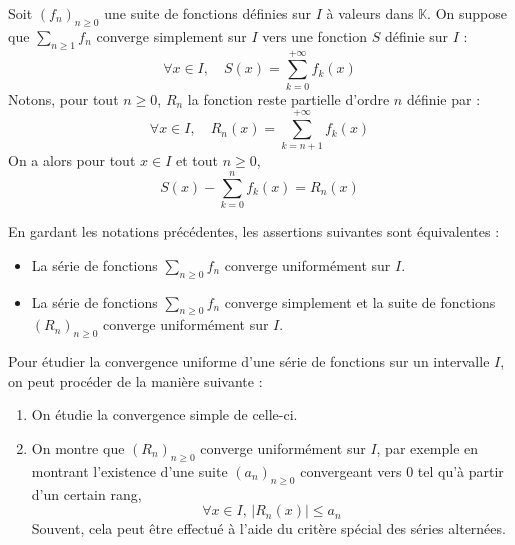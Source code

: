 \documentclass[a4paper,10pt]{report}
\begin{document}
\medskip

Soit $(f_n)_{n \geq 0}$ une suite de fonctions définies sur $I$ à valeurs dans $\mathbb{K}$. On suppose que $\sum_{n \geq 1} f_n$ converge simplement sur $I$ vers une fonction $S$ définie sur $I$ :
$$ \forall x \in I, \quad S(x) = \sum_{k=0}^{+ \infty} f_k(x)$$
Notons, pour tout $n \geq 0$, $R_n$ la fonction reste partielle d'ordre $n$ définie par :
$$ \forall x \in I, \quad R_n(x) = \sum_{k=n+1}^{+ \infty} f_k(x)$$
On a alors pour tout $x \in I$ et tout $n \geq 0$,
$$ S(x) - \sum_{k=0}^n f_k(x) = R_n(x)$$

\begin{Proposition}{}\label{CritCVU} En gardant les notations précédentes, les assertions suivantes sont équivalentes :

\begin{itemize}
\item La série de fonctions $\sum_{n \geq 0} f_n$ converge uniformément sur $I$.
\item La série de fonctions $\sum_{n \geq 0} f_n$ converge simplement et la suite de fonctions $(R_n)_{n \geq 0}$ converge uniformément sur $I$.
\end{itemize}
\end{Proposition}

\begin{metho} Pour étudier la convergence uniforme d'une série de fonctions sur un intervalle $I$, on peut procéder de la manière suivante :
\begin{enumerate}
\item On étudie la convergence simple de celle-ci.
\item On montre que $(R_n)_{n \geq 0}$ converge uniformément sur $I$, par exemple en montrant l'existence d'une suite $(a_n)_{n \geq 0}$ convergeant vers $0$ tel qu'à partir d'un certain rang,
$$ \forall x \in I, \, \vert R_n(x) \vert \leq a_n $$
Souvent, cela peut être effectué à l'aide du critère spécial des séries alternées.
\end{enumerate}
\end{metho}
\end{document}
